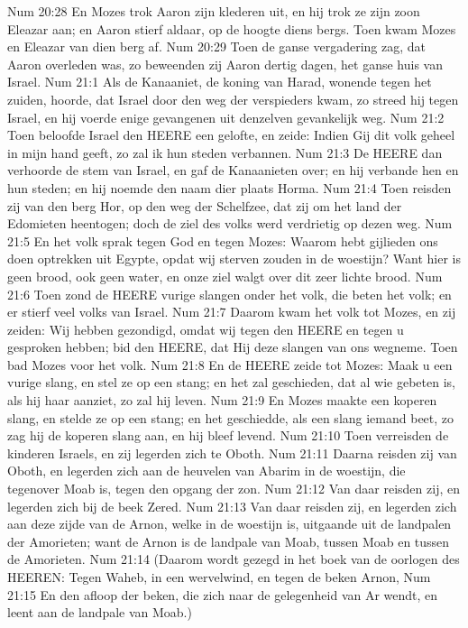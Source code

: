 Num 20:28  En Mozes trok Aaron zijn klederen uit, en hij trok ze zijn zoon Eleazar aan; en Aaron stierf aldaar, op de hoogte diens bergs. Toen kwam Mozes en Eleazar van dien berg af.
Num 20:29  Toen de ganse vergadering zag, dat Aaron overleden was, zo beweenden zij Aaron dertig dagen, het ganse huis van Israel.
Num 21:1  Als de Kanaaniet, de koning van Harad, wonende tegen het zuiden, hoorde, dat Israel door den weg der verspieders kwam, zo streed hij tegen Israel, en hij voerde enige gevangenen uit denzelven gevankelijk weg.
Num 21:2  Toen beloofde Israel den HEERE een gelofte, en zeide: Indien Gij dit volk geheel in mijn hand geeft, zo zal ik hun steden verbannen.
Num 21:3  De HEERE dan verhoorde de stem van Israel, en gaf de Kanaanieten over; en hij verbande hen en hun steden; en hij noemde den naam dier plaats Horma.
Num 21:4  Toen reisden zij van den berg Hor, op den weg der Schelfzee, dat zij om het land der Edomieten heentogen; doch de ziel des volks werd verdrietig op dezen weg.
Num 21:5  En het volk sprak tegen God en tegen Mozes: Waarom hebt gijlieden ons doen optrekken uit Egypte, opdat wij sterven zouden in de woestijn? Want hier is geen brood, ook geen water, en onze ziel walgt over dit zeer lichte brood.
Num 21:6  Toen zond de HEERE vurige slangen onder het volk, die beten het volk; en er stierf veel volks van Israel.
Num 21:7  Daarom kwam het volk tot Mozes, en zij zeiden: Wij hebben gezondigd, omdat wij tegen den HEERE en tegen u gesproken hebben; bid den HEERE, dat Hij deze slangen van ons wegneme. Toen bad Mozes voor het volk.
Num 21:8  En de HEERE zeide tot Mozes: Maak u een vurige slang, en stel ze op een stang; en het zal geschieden, dat al wie gebeten is, als hij haar aanziet, zo zal hij leven.
Num 21:9  En Mozes maakte een koperen slang, en stelde ze op een stang; en het geschiedde, als een slang iemand beet, zo zag hij de koperen slang aan, en hij bleef levend.
Num 21:10  Toen verreisden de kinderen Israels, en zij legerden zich te Oboth.
Num 21:11  Daarna reisden zij van Oboth, en legerden zich aan de heuvelen van Abarim in de woestijn, die tegenover Moab is, tegen den opgang der zon.
Num 21:12  Van daar reisden zij, en legerden zich bij de beek Zered.
Num 21:13  Van daar reisden zij, en legerden zich aan deze zijde van de Arnon, welke in de woestijn is, uitgaande uit de landpalen der Amorieten; want de Arnon is de landpale van Moab, tussen Moab en tussen de Amorieten.
Num 21:14  (Daarom wordt gezegd in het boek van de oorlogen des HEEREN: Tegen Waheb, in een wervelwind, en tegen de beken Arnon,
Num 21:15  En den afloop der beken, die zich naar de gelegenheid van Ar wendt, en leent aan de landpale van Moab.)
